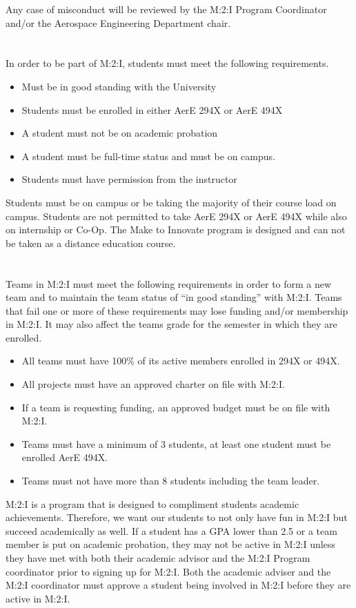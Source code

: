 Any case of misconduct will be reviewed by the M:2:I Program Coordinator and/or the Aerospace Engineering Department chair.  

\section{}
In order to be part of M:2:I, students must meet the following requirements.

\begin{itemize}
\item Must be in good standing with the University
\item Students must be enrolled in either AerE 294X or AerE 494X
\item A student must not be on academic probation
\item A student must be full-time status and must be on campus.
\item Students must have permission from the instructor
\end{itemize}

Students must be on campus or be taking the majority of their course load on campus.  Students are not permitted to take AerE 294X or AerE 494X while also on internship or Co-Op.  The Make to Innovate program is designed and can not be taken as a distance education course.

\section{}
Teams in M:2:I must meet the following requirements in order to form a new team and to maintain the team status of ``in good standing'' with M:2:I.  Teams that fail one or more of these requirements may lose funding and/or membership in M:2:I.  It may also affect the teams grade for the semester in which they are enrolled.
\begin{itemize}
\item All teams must have 100\% of its active members enrolled in 294X or 494X.
\item All projects must have an approved charter on file with M:2:I.
\item If a team is requesting funding, an approved budget must be on file with M:2:I.
\item Teams must have a minimum of 3 students, at least one student must be enrolled AerE 494X.
\item Teams must not have more than 8 students including the team leader.
\end{itemize}

M:2:I is a program that is designed to compliment students academic achievements.  Therefore, we want our students to not only have fun in M:2:I but succeed academically as well.  If a student has a GPA lower than 2.5 or a team member is put on academic probation, they may not be active in M:2:I unless they have met with both their academic advisor and the M:2:I Program coordinator prior to signing up for M:2:I.  Both the academic adviser and the M:2:I coordinator must approve a student being involved in M:2:I before they are active in M:2:I.

